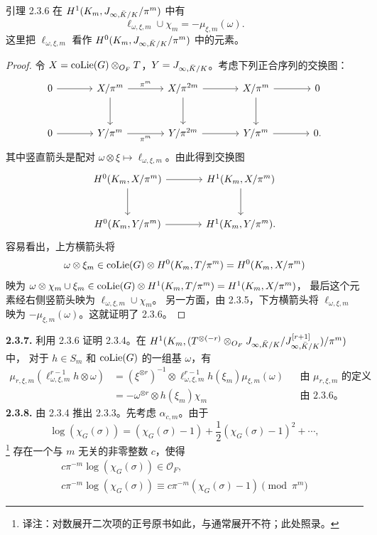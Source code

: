 \begin{statement}{引理 2.3.6}
在 $H^1(K_m,J_{\infty,\bar K/K}/\pi^m)$ 中有
\[
\ell_{\omega,\xi,m}\cup\chi_m=-\mu_{\xi,m}(\omega).
\]
这里把 $\ell_{\omega,\xi,m}$ 看作 $H^0(K_m,J_{\infty,\bar K/K}/\pi^m)$ 中的元素。
\end{statement}
\begin{proof}
令 $X=\operatorname{coLie}(G)\otimes_{O_F}T$，$Y=J_{\infty,\bar K/K}$。考虑下列正合序列的交换图：
\[
\begin{tikzcd}[ampersand replacement=\&,column sep=large,row sep=large]
0\arrow[r]\&X/\pi^m\arrow[r,"{\pi^m}"]\arrow[d]\&X/\pi^{2m}\arrow[r]\arrow[d]\&X/\pi^m\arrow[r]\arrow[d]\&0\\
0\arrow[r]\&Y/\pi^m\arrow[r,"{\pi^m}"']\&Y/\pi^{2m}\arrow[r]\&Y/\pi^m\arrow[r]\&0.
\end{tikzcd}
\]
其中竖直箭头是配对 $\omega\otimes\xi\mapsto\ell_{\omega,\xi,m}$。由此得到交换图
\[
\begin{tikzcd}[ampersand replacement=\&,column sep=large,row sep=large]
H^0(K_m,X/\pi^m)\arrow[r]\arrow[d]\&H^1(K_m,X/\pi^m)\arrow[d]\\
H^0(K_m,Y/\pi^m)\arrow[r]\&H^1(K_m,Y/\pi^m).
\end{tikzcd}
\]
容易看出，上方横箭头将
\[
\omega\otimes\xi_m\in\operatorname{coLie}(G)\otimes H^0(K_m,T/\pi^m)=H^0(K_m,X/\pi^m)
\]
映为
$\omega\otimes\chi_m\cup\xi_m\in\operatorname{coLie}(G)\otimes H^1(K_m,T/\pi^m)=H^1(K_m,X/\pi^m)$，
最后这个元素经右侧竖箭头映为 $\ell_{\omega,\xi,m}\cup\chi_m$。
另一方面，由 2.3.5，下方横箭头将 $\ell_{\omega,\xi,m}$ 映为
$-\mu_{\xi,m}(\omega)$。这就证明了 2.3.6。
\end{proof}
\noindent\textbf{2.3.7.} 利用 2.3.6 证明 2.3.4。在
$H^1(K_m,(T^{\otimes(-r)}\otimes_{O_F}J_{\infty,\bar K/K}/J_{\infty,\bar K/K}^{[r+1]})/\pi^m)$ 中，
对于 $h\in S_m$ 和 $\operatorname{coLie}(G)$ 的一组基 $\omega$，有
\begin{align*}
\mu_{r,\xi,m}(\ell_{\omega,\xi,m}^{r-1}h\otimes\omega)
&=(\xi^{\otimes r})^{-1}\otimes
\ell_{\omega,\xi,m}^{r-1}h(\xi_m)\mu_{\xi,m}(\omega)
&&\text{由 $\mu_{r,\xi,m}$ 的定义}\\
&=-\omega^{\otimes r}\otimes h(\xi_m)\chi_m
&&\text{由 2.3.6。}
\end{align*}
\noindent\textbf{2.3.8.} 由 2.3.4 推出 2.3.3。先考虑 $\alpha_{c,m}$。由于
\[
\log(\chi_G(\sigma))=(\chi_G(\sigma)-1)+\frac12(\chi_G(\sigma)-1)^2+\cdots,
\]
\footnote{译注：对数展开二次项的正号原书如此，与通常展开不符；此处照录。}
存在一个与 $m$ 无关的非零整数 $c$，使得
\begin{equation*}\tag{*}
\begin{gathered}
c\pi^{-m}\log(\chi_G(\sigma))\in\mathcal O_F,\\
c\pi^{-m}\log(\chi_G(\sigma))\equiv
c\pi^{-m}(\chi_G(\sigma)-1)\pmod{\pi^m}
\end{gathered}
\end{equation*}
